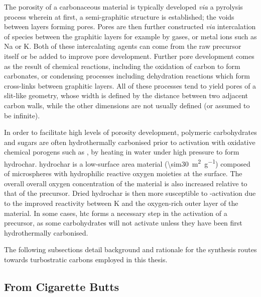 The porosity of a carbonaceous material is typically developed \textit{via} a pyrolysis process wherein at first, a semi-graphitic structure is established; the voids between layers forming pores. Pores are then further constructed  \textit{via} intercalation of species between the graphitic layers for example by gases,\citep{Gonzalez2009} or metal ions such as Na or K.\citep{Sevilla2014Energy, Osswald2009Porosity, Wang2012KOH, RuizFernandez2011} Both of these intercalating agents can come from the raw precursor itself or be added to improve pore development. Further pore development comes as the result of chemical reactions, including the oxidation of carbon to form carbonates, or condensing processes including dehydration reactions which form cross-links between graphitic layers.\citep{Sevilla2014Energy, Wang2012KOH, Prahas2008} All of these processes tend to yield pores of a slit-like geometry, whose width is defined by the distance between two adjacent carbon walls, while the other dimensions are not usually defined (or assumed to be infinite).\citep{Sevilla2019, Everett1976Adsorption}

In order to facilitate high levels of porosity development, polymeric carbohydrates and sugars are often hydrothermally carbonised prior to activation with oxidative chemical \glspl{porogen} such as , by heating in water under high pressure to form \gls{hydrochar}. \Gls{hydrochar} is a low-surface area material (\qty{\sim30}{\metre\squared\per\gram}) composed of microspheres with hydrophilic reactive oxygen moieties at the surface. The overall overall oxygen concentration of the material is also increased relative to that of the precursor.\citep{Titirici2010Chemistry, Sevilla2011High} Dried \gls{hydrochar} is then more susceptible to -activation due to the improved reactivity between K and the oxygen-rich outer layer of the material.\citep{Sevilla2011High, Sevilla2009Chemical} In some cases, \gls{htc} forms a necessary step in the activation of a precursor, as some carbohydrates will not activate unless they have been first hydrothermally carbonised.\citep{Ares2014}

The following subsections detail background and rationale for the synthesis routes towards \glspl{turbostratic carbon} employed in this thesis.

\subsection{From Cigarette Butts}

